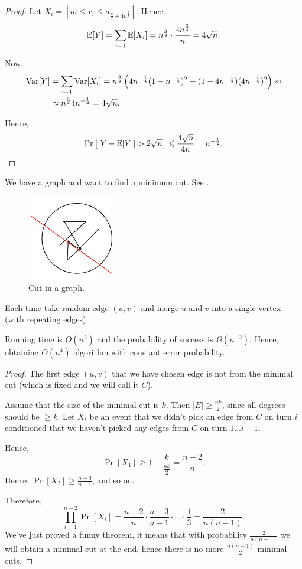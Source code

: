 \begin{proof}
    Let $X_i = \left[m \leq r_i \leq a_{\frac n 2 + 4 n^{\frac 3 4}}\right]$.
    Hence,
    \[
        \mathbb{E}[Y] = \sum_{i = 1} \mathbb{E}[X_i] = n^{\frac 3 4} \cdot \frac{4 n^{\frac 3 4}}{n} = 4 \sqrt n.
    \]

    Now,
    \begin{align*}
        \operatorname{Var}[Y] &= \sum_{i = 1} \operatorname{Var}[X_i] = n^{\frac 3 4} \left(4 n^{-\frac 1 4} (1 - n^{-\frac 1 4})^2 + (1 - 4 n^{-\frac14}) (4 n^{-\frac14})^2\right) \approx \\
        &\approx n^{\frac 3 4} 4 n^{-\frac14} = 4 \sqrt n.
    \end{align*}

    Hence,
    \[
        \Pr\left[|Y - \mathbb{E}[Y]| > 2 \sqrt n\right] \leqslant \frac{4 \sqrt n}{4 n} = n^{-\frac 1 2}. \qedhere
    \]
\end{proof}

\begin{algorithm}[Cargo's]
    We have a graph and want to find a minimum cut.
    See .
 \begin{figure}[H]
        \centering
        \includegraphics[width=0.35\textwidth]{figures/1FD33D2B-A2E6-4129-B8B8-91EE68F24AC6}
        \caption{Cut in a graph.}
        \label{fig:1fd33d2b-a2e6-4129-b8b8-91ee68f24ac6}
    \end{figure}
    Each time take random edge $(u, v)$ and merge $u$ and $v$ into a single vertex (with repeating edges).

    Running time is $O(n^2)$ and the probability of success is $\Omega(n^{-2})$.
    Hence, obtaining $O(n^4)$ algorithm with constant error probability.
\end{algorithm}
\begin{proof}
    The first edge $(u, v)$ that we have chosen edge is not from the minimal cut (which is fixed and we will call it $C$).

    Assume that the size of the minimal cut is $k$.
    Then $|E| \geq \frac {nk} 2$, since all degrees should be $\geq k$.
    Let $X_i$ be an event that we didn't pick an edge from $C$ on turn $i$ conditioned that we haven't picked any edges from $C$ on turn $1\ldots i - 1$.

    Hence,
    \[
        \Pr[X_1] \geq 1 - \frac {k} {\frac {nk} {2}} = \frac {n - 2} n.
    \]
    Hence, $\Pr[X_2] \geq \frac{n - 3}{n - 1}$, and so on.

    Therefore,
    \[
        \prod_{i = 1}^{n - 2} \Pr[X_i] = \frac{n - 2}{n} \cdot \frac{n - 3}{n - 1} \cdot \dots \cdot \frac 1 3 = \frac{2}{n (n - 1)}.
    \]
    We've just proved a funny theorem, it means that with probability $\frac{2}{n (n - 1)}$ we will obtain a minimal cut at the end, hence there is no more $\frac{n (n - 1)}{2}$ minimal cuts.
\end{proof}

